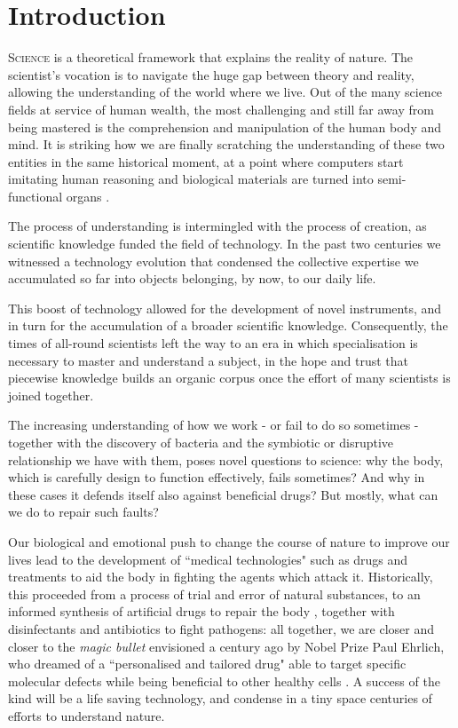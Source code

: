 \chapter{Introduction} \label{chapter:intro}

\lettrine{S}{cience} is a theoretical framework that explains the reality of nature. The scientist's vocation is to navigate the huge gap between theory and reality, allowing the understanding of the world where we live.
%
Out of the many science fields at service of human wealth, the most challenging and still far away from being mastered is the comprehension and manipulation of the human body and mind. It is striking how we are finally scratching the understanding of these two entities in the same historical moment, at a point where computers start imitating human reasoning \citep{AlphaGo,googleAIblog,Alom2019} and biological materials are turned into semi-functional organs \citep{Rossi2018}.

The process of understanding is intermingled with the process of creation, as scientific knowledge funded the field of technology. In the past two centuries we witnessed a technology evolution that condensed the collective expertise we accumulated so far into objects belonging, by now, to our daily life.

This boost of technology allowed for the development of novel instruments, and in turn for the accumulation of a broader scientific knowledge. Consequently, the times of all-round scientists left the way to an era in which specialisation is necessary to master and understand a subject, in the hope and trust that piecewise knowledge builds an organic corpus once the effort of many scientists is joined together.

The increasing understanding of how we work - or fail to do so sometimes - together with the discovery of bacteria and the symbiotic or disruptive relationship we have with them, poses novel questions to science: why the body, which is carefully design to function effectively, fails sometimes? And why in these cases it defends itself also against beneficial drugs? But mostly, what can we do to repair such faults?

Our biological and emotional push to change the course of nature to improve our lives lead to the development of ``medical technologies" such as drugs and treatments to aid the body in fighting the agents which attack it. Historically, this proceeded from a process of trial and error of natural substances, to an informed synthesis of artificial drugs to repair the body \citep{Wishart2018}, together with disinfectants \citep{WIDES_database} and antibiotics \citep{ABXdatabaseJhopkins} to fight pathogens: all together, we are closer and closer to the \emph{magic bullet} envisioned a century ago by Nobel Prize Paul Ehrlich, who dreamed of a ``personalised and tailored drug" able to target specific molecular defects while being beneficial to other healthy cells \citep{Strebhardt2008}. A success of the kind will be a life saving technology, and condense in a tiny space centuries of efforts to understand nature.

